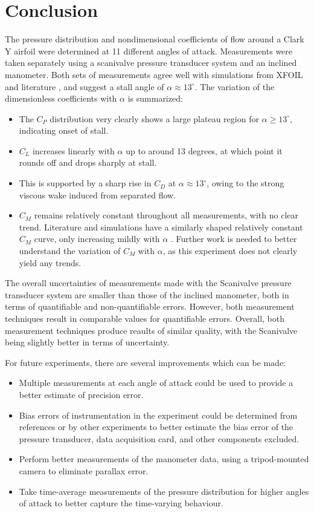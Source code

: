 \documentclass[runningheads]{llncs}
\begin{document}
\section{Conclusion}
The pressure distribution and nondimensional coefficients of flow around a Clark Y airfoil were determined at 11 different angles of attack. Measurements were taken separately using a scanivalve pressure transducer system and an inclined manometer. Both sets of measurements agree well with simulations from XFOIL and literature \cite{lyon_broeren_giguere_gopalarathnam_selig_1997}, and suggest a stall angle of $\alpha \approx 13^\circ$. The variation of the dimensionless coefficients with $\alpha$ is summarized:
\begin{itemize}
    \item The $C_P$ distribution very clearly shows a large plateau region for $\alpha \ge 13^\circ$, indicating onset of stall.
    \item $C_L$ increases linearly with $\alpha$ up to around 13 degrees, at which point it rounds off and drops sharply at stall.
    \item This is supported by a sharp rise in $C_D$ at $\alpha \approx 13^\circ$, owing to the strong viscous wake induced from separated flow.
    \item $C_M$ remains relatively constant throughout all measurements, with no clear trend. Literature and simulations have a similarly shaped relatively constant $C_M$ curve, only increasing mildly with $\alpha$ . Further work is needed to better understand the variation of $C_M$ with $\alpha$, as this experiment does not clearly yield any trends.
\end{itemize}

\noindent
The overall uncertainties of measurements made with the Scanivalve pressure transducer system are smaller than those of the inclined manometer, both in terms of quantifiable and non-quantifiable errors. However, both measurement techniques result in comparable values for quantifiable errors. Overall, both measurement techniques produce reaults of similar quality, with the Scanivalve being slightly better in terms of uncertainty.

\noindent
For future experiments, there are several improvements which can be made:
\begin{itemize}
    \item Multiple measurements at each angle of attack could be used to provide a better estimate of precision error.
    \item Bias errors of instrumentation in the experiment could be determined from references or by other experiments to better estimate the bias error of the pressure transducer, data acquisition card, and other components excluded.
    \item Perform better measurements of the manometer data, using a tripod-mounted camera to eliminate parallax error.
    \item Take time-average measurements of the pressure distribution for higher angles of attack to better capture the time-varying behaviour.
\end{itemize}
\end{document}
